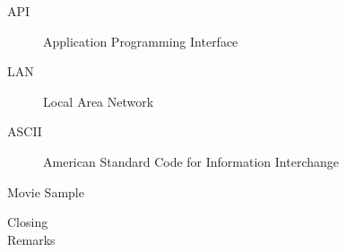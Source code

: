 \documentclass[aspectratio=43]{beamer}
\begin{document}
\begin{frame}
    \begin{description}
        \item[API] Application Programming Interface
        \item[LAN] Local Area Network
        \item[ASCII] American Standard Code for Information Interchange
    \end{description}
\end{frame}

\begin{frame}{Movie Sample}
    \centering

\end{frame}

\begin{frame}
    \centering

    \Huge

    Closing\\
    Remarks
\end{frame}
\end{document}
